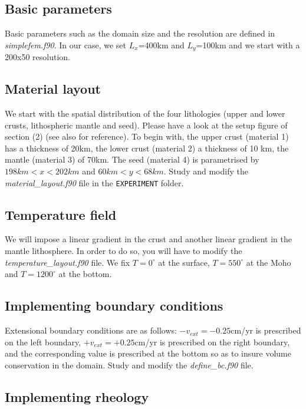 \subsection*{Basic parameters}

Basic parameters such as the domain size and the resolution are defined in {\sl simplefem.f90}.
In our case, we set $L_x$=400km and $L_y$=100km and we start with a 200x50 resolution. 

\subsection*{Material layout}

We start with the spatial distribution of the four lithologies (upper and lower crusts, lithospheric mantle and seed). 
Please have a look at the setup figure of section (2) (see also \cite{nabu15} for reference). 
To begin with, the upper crust (material 1) has a thickness of 20km, the lower crust (material 2) a thickness of 10 km, 
the mantle (material 3) of 70km. The seed (material 4) is parametrised by $198km<x<202km$ and $60km<y<68km$.
Study and modify the {\sl material\_layout.f90} file in the {\tt EXPERIMENT} folder. 

\subsection*{Temperature field}

We will impose a linear gradient in the crust and another linear gradient in the mantle lithosphere.
In order to do so, you will have to modify the {\sl temperature\_layout.f90} file. We fix $T=0^\circ$ at the 
surface, $T=550^\circ$ at the Moho and $T=1200^\circ$ at the bottom.

\subsection*{Implementing boundary conditions}

Extensional boundary conditions are as follows: 
$-v_{ext}=-0.25$cm/yr is prescribed on the left boundary,
$+v_{ext}=+0.25$cm/yr is prescribed on the right boundary,
and the corresponding value is prescribed at the bottom so as to insure volume conservation in the domain.
Study and modify the {\sl define\_bc.f90} file.

\subsection*{Implementing rheology}

